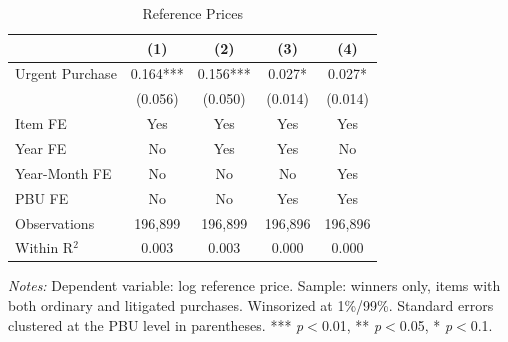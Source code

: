 \begin{table}[ht]
  \centering
  \caption{Reference Prices}
  \label{tab:ref_prices}
  \small
  \begin{threeparttable}
  \begin{tabular}{lcccc}
    \hline\hline
    & (1) & (2) & (3) & (4) \\
    \hline
    Urgent Purchase & 0.164*** & 0.156*** & 0.027* & 0.027* \\
     & (0.056) & (0.050) & (0.014) & (0.014) \\[3pt]
    \hline
    Item FE & Yes & Yes & Yes & Yes \\
    Year FE & No & Yes & Yes & No \\
    Year-Month FE & No & No & No & Yes \\
    PBU FE & No & No & Yes & Yes \\
    Observations & 196,899 & 196,899 & 196,896 & 196,896 \\
    Within R$^2$ & 0.003 & 0.003 & 0.000 & 0.000 \\
    \hline\hline
  \end{tabular}
  \begin{tablenotes}
    \small
    \item \textit{Notes:} Dependent variable: log reference price. Sample: winners only, items with both ordinary and litigated purchases. Winsorized at 1\%/99\%. Standard errors clustered at the PBU level in parentheses. *** \textit{p}$<$0.01, ** \textit{p}$<$0.05, * \textit{p}$<$0.1.
  \end{tablenotes}
  \end{threeparttable}
\end{table}
